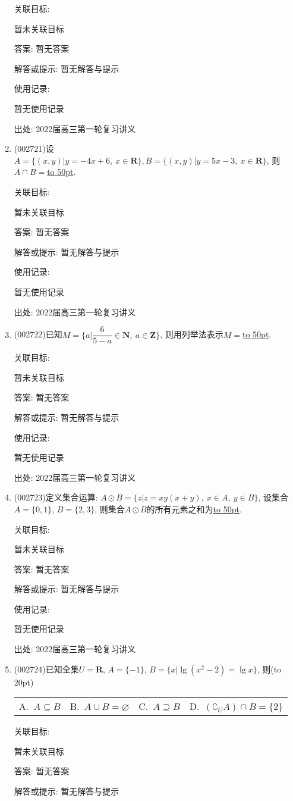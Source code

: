 \documentclass[10pt,a4paper]{article}
\newcommand{\blank}[1]{\underline{\hbox to #1pt{}}}
\newcommand{\bracket}[1]{(\hbox to #1pt{})}
\newcommand{\fourch}[4]{\par\begin{tabular}{p{.23\textwidth}p{.23\textwidth}p{.23\textwidth}p{.23\textwidth}}
A.~#1 &B.~#2& C.~#3& D.~#4
\end{tabular}}
\begin{document}
\begin{enumerate}[1.]
关联目标:

暂未关联目标

答案: 暂无答案

解答或提示: 暂无解答与提示

使用记录:

暂无使用记录


出处: 2022届高三第一轮复习讲义
\item { (002721)}设$A=\{(x,y)|y=-4x+6,\ x\in \mathbf{R}\}, B=\{(x,y)|y=5x-3,\ x\in \mathbf{R}\}$, 则$A\cap B=$\blank{50}.


关联目标:

暂未关联目标

答案: 暂无答案

解答或提示: 暂无解答与提示

使用记录:

暂无使用记录


出处: 2022届高三第一轮复习讲义
\item { (002722)}已知$M=\{a|\dfrac6{5-a}\in \mathbf{N}, \ a\in \mathbf{Z}\}$, 则用列举法表示$M=$\blank{50}.


关联目标:

暂未关联目标

答案: 暂无答案

解答或提示: 暂无解答与提示

使用记录:

暂无使用记录


出处: 2022届高三第一轮复习讲义
\item { (002723)}定义集合运算: $A\odot B=\{z|z=xy(x+y), \ x\in A, \ y\in B \}$, 设集合$A=\{0,1\}$, $B=\{2,3\}$, 则集合$A\odot B$的所有元素之和为\blank{50}.


关联目标:

暂未关联目标

答案: 暂无答案

解答或提示: 暂无解答与提示

使用记录:

暂无使用记录


出处: 2022届高三第一轮复习讲义
\item { (002724)}已知全集$U=\mathbf{R}$, $A=\{-1\}$, $B=\{x|\lg (x^2-2)=\lg x\}$, 则\bracket{20}
\fourch{$A\subseteq B$}{$A\cup B=\varnothing$}{$A\supseteq B$}{$(\complement_U A)\cap B=\{2\}$}


关联目标:

暂未关联目标

答案: 暂无答案

解答或提示: 暂无解答与提示


\end{enumerate}
\end{document}
